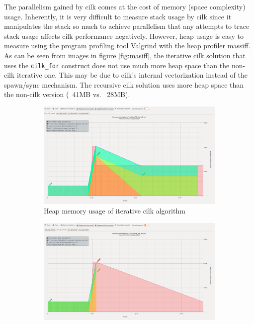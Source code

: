 The parallelism gained by cilk comes at the cost of memory (space complexity) usage. Inherently, it is very difficult to measure stack usage by cilk since it manipulates the stack so much to achieve parallelism that any attempts to trace stack usage affects cilk performance negatively. However, heap usage is easy to measure using the program profiling tool Valgrind with the heap profiler massiff. As can be seen from images in figure \ref{fig:masiff}, the iterative cilk solution that uses the \texttt{cilk\_for} construct does not use much more heap space than the non-cilk iterative one. This may be due to cilk’s internal vectorization instead of the spawn/sync mechanism. The recursive cilk solution uses more heap space than the non-cilk version (~41MB vs. ~28MB). 

\begin{landscape}
\thispagestyle{empty}
\begin{figure}
\centering
        \begin{subfigure}[b]{0.65\textwidth}
            \center
            \includegraphics[width=\textwidth]{img/fft_iter_cilk.png}
            \caption{Heap memory usage of iterative cilk algorithm}
            \label{fig:heap_iter_cilk}
        \end{subfigure}%
        \begin{subfigure}[b]{0.65\textwidth}
            \center
            \includegraphics[width=\textwidth]{img/fft_iter_cpp.png}

\end{subfigure}
\end{figure}
\end{landscape}
